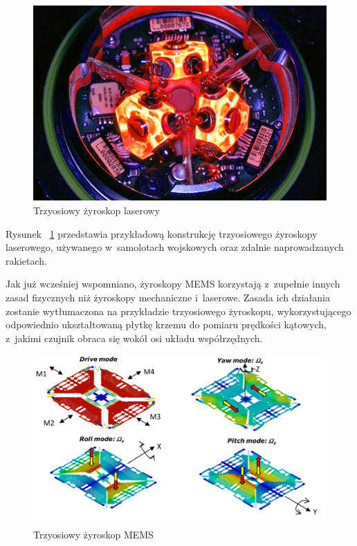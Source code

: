 \begin{figure}[H]
	\centering
	\includegraphics[scale=0.4]{Pictures/3d_laser_ring_gyro.jpg}
        \caption[Trzyosiowy żyroskop laserowy]{Trzyosiowy żyroskop laserowy~\cite{mems7}}
        \label{fig:3d_laser_ring_gyro}
\end{figure}

Rysunek ~\ref{fig:3d_laser_ring_gyro} przedstawia przykładową konstrukcję trzyosiowego żyroskopy laserowego, używanego w~samolotach wojskowych oraz zdalnie naprowadzanych rakietach. 

Jak już wcześniej wspomniano, żyroskopy MEMS korzystają z~zupełnie innych zasad fizycznych niż żyroskopy mechaniczne i~laserowe. Zasada ich działania zostanie wytłumaczona na przykładzie trzyosiowego żyroskopu, wykorzystującego odpowiednio ukształtowaną płytkę krzemu do pomiaru prędkości kątowych, z~jakimi czujnik obraca się wokół osi układu współrzędnych.

\begin{figure}[H]
	\centering
	\includegraphics[scale=0.4]{Pictures/3d_gyro.png}
        \caption[Trzyosiowy żyroskop MEMS]{Trzyosiowy żyroskop MEMS~\cite{mems6}}
        \label{fig:3d_gyro}
\end{figure}

